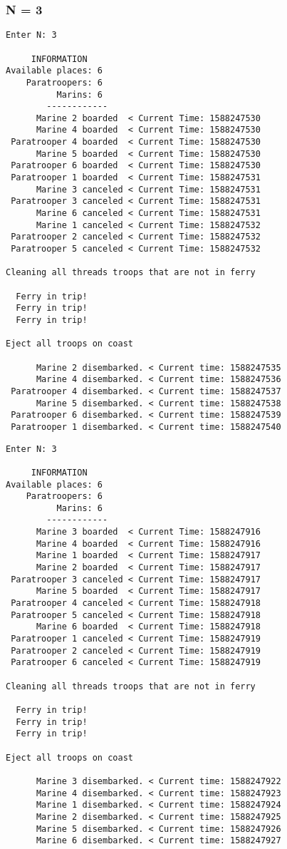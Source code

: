 \documentclass{article}
\begin{document}
\subsubsection*{N = 3}
\begin{lstlisting}[]
Enter N: 3

     INFORMATION
Available places: 6
    Paratroopers: 6
          Marins: 6
        ------------
      Marine 2 boarded  < Current Time: 1588247530 
      Marine 4 boarded  < Current Time: 1588247530 
 Paratrooper 4 boarded  < Current Time: 1588247530 
      Marine 5 boarded  < Current Time: 1588247530 
 Paratrooper 6 boarded  < Current Time: 1588247530 
 Paratrooper 1 boarded  < Current Time: 1588247531 
      Marine 3 canceled < Current Time: 1588247531 
 Paratrooper 3 canceled < Current Time: 1588247531 
      Marine 6 canceled < Current Time: 1588247531 
      Marine 1 canceled < Current Time: 1588247532 
 Paratrooper 2 canceled < Current Time: 1588247532 
 Paratrooper 5 canceled < Current Time: 1588247532 

Cleaning all threads troops that are not in ferry

  Ferry in trip!
  Ferry in trip!
  Ferry in trip!

Eject all troops on coast

      Marine 2 disembarked. < Current time: 1588247535
      Marine 4 disembarked. < Current time: 1588247536
 Paratrooper 4 disembarked. < Current time: 1588247537
      Marine 5 disembarked. < Current time: 1588247538
 Paratrooper 6 disembarked. < Current time: 1588247539
 Paratrooper 1 disembarked. < Current time: 1588247540
\end{lstlisting}
\begin{lstlisting}[]
Enter N: 3

     INFORMATION
Available places: 6
    Paratroopers: 6
          Marins: 6
        ------------
      Marine 3 boarded  < Current Time: 1588247916 
      Marine 4 boarded  < Current Time: 1588247916 
      Marine 1 boarded  < Current Time: 1588247917 
      Marine 2 boarded  < Current Time: 1588247917 
 Paratrooper 3 canceled < Current Time: 1588247917 
      Marine 5 boarded  < Current Time: 1588247917 
 Paratrooper 4 canceled < Current Time: 1588247918 
 Paratrooper 5 canceled < Current Time: 1588247918 
      Marine 6 boarded  < Current Time: 1588247918 
 Paratrooper 1 canceled < Current Time: 1588247919 
 Paratrooper 2 canceled < Current Time: 1588247919 
 Paratrooper 6 canceled < Current Time: 1588247919 

Cleaning all threads troops that are not in ferry

  Ferry in trip!
  Ferry in trip!
  Ferry in trip!

Eject all troops on coast

      Marine 3 disembarked. < Current time: 1588247922
      Marine 4 disembarked. < Current time: 1588247923
      Marine 1 disembarked. < Current time: 1588247924
      Marine 2 disembarked. < Current time: 1588247925
      Marine 5 disembarked. < Current time: 1588247926
      Marine 6 disembarked. < Current time: 1588247927


\end{lstlisting}
\end{document}
